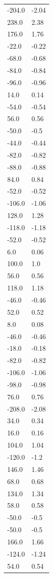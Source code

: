 \begin{longtable}{ll}
-204.0 & -2.04 \\
238.0 & 2.38 \\
176.0 & 1.76 \\
-22.0 & -0.22 \\
-68.0 & -0.68 \\
-84.0 & -0.84 \\
-96.0 & -0.96 \\
14.0 & 0.14 \\
-54.0 & -0.54 \\
56.0 & 0.56 \\
-50.0 & -0.5 \\
-44.0 & -0.44 \\
-82.0 & -0.82 \\
-88.0 & -0.88 \\
84.0 & 0.84 \\
-52.0 & -0.52 \\
-106.0 & -1.06 \\
128.0 & 1.28 \\
-118.0 & -1.18 \\
-52.0 & -0.52 \\
6.0 & 0.06 \\
100.0 & 1.0 \\
56.0 & 0.56 \\
118.0 & 1.18 \\
-46.0 & -0.46 \\
52.0 & 0.52 \\
8.0 & 0.08 \\
-46.0 & -0.46 \\
-18.0 & -0.18 \\
-82.0 & -0.82 \\
-106.0 & -1.06 \\
-98.0 & -0.98 \\
76.0 & 0.76 \\
-208.0 & -2.08 \\
34.0 & 0.34 \\
16.0 & 0.16 \\
104.0 & 1.04 \\
-120.0 & -1.2 \\
146.0 & 1.46 \\
68.0 & 0.68 \\
134.0 & 1.34 \\
58.0 & 0.58 \\
-50.0 & -0.5 \\
-50.0 & -0.5 \\
166.0 & 1.66 \\
-124.0 & -1.24 \\
54.0 & 0.54 \\

\end{longtable}
